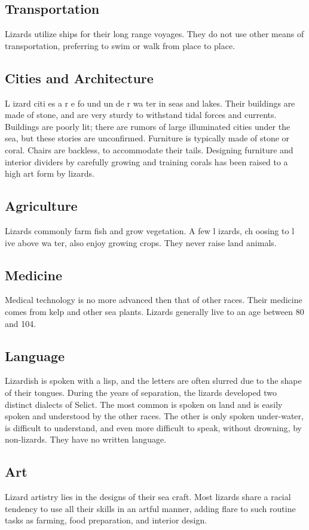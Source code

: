 \begin{multicols*}{2}
\subsection{Transportation}
Lizards utilize ships for their long range voyages.
They do not use other means of transportation, preferring to
swim or walk from place to place.
\subsection{Cities and Architecture}
L izard citi es a r e fo und un de r wa ter in seas and
lakes. Their buildings are made of stone, and are very sturdy
to withstand tidal forces and currents. Buildings are poorly lit;
there are rumors of large illuminated cities under the sea, but
these stories are unconfirmed.
Furniture is typically made of stone or coral. Chairs
are backless, to accommodate their tails. Designing furniture
and interior dividers by carefully growing and training corals
has been raised to a high art form by lizards.
\subsection{Agriculture}
Lizards commonly farm fish and grow vegetation.
A few l izards, ch oosing to l ive above wa ter, also enjoy
growing crops. They never raise land animals.
\subsection{Medicine}
Medical technology is no more advanced then that
of other races. Their medicine comes from kelp and other sea
plants. Lizards generally live to an age between 80 and 104.
\subsection{Language}
Lizardish is spoken with a lisp, and the letters are
often slurred due to the shape of their tongues. During the
years of separation, the lizards developed two distinct dialects
of Selict. The most common is spoken on land and is easily
spoken and understood by the other races. The other is only
spoken under-water, is difficult to understand, and even more
difficult to speak, without drowning, by non-lizards. They
have no written language.
\subsection{Art}
Lizard artistry lies in the designs of their sea craft.
Most lizards share a racial tendency to use all their skills in an
artful manner, adding flare to such routine tasks as farming,
food preparation, and interior design.

\end{multicols*}
